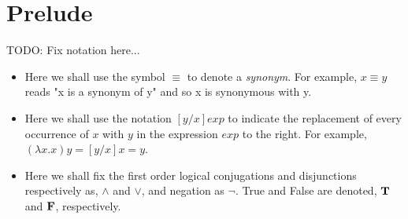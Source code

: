 
\section{Prelude} %
\label{sec:purelude}
TODO: Fix notation here...

\begin{itemize}

\item
Here we shall use the symbol $\equiv$ to denote a \emph{synonym}.
For example, $x \equiv y$ reads "x is a synonym of y" and so x
is synonymous with y.

\item
Here we shall use the notation $[y/x] exp$ to
indicate the replacement of every occurrence of $x$ with $y$
in the expression $exp$ to the right. For example,
$(\lambda x.x)y = [y/x]x = y$.

\item
Here we shall fix the first order logical conjugations and
disjunctions respectively as, $\wedge$ and $\vee$, and negation
as $\neg$. True and False are denoted, $\textbf{T}$ and $\textbf{F}$,
respectively.

\end{itemize}
